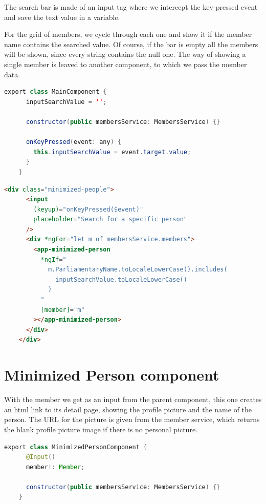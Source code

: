 \documentclass[12pt, a4paper]{article}
\begin{document}
  The search bar is made of an input tag where we intercept the key-pressed event and save the text value in a variable.

  For the grid of members, we cycle through each one and show it if the member name contains the searched value. Of course, if the bar is empty all the members will be shown, since every string contains the null one. The way of showing a single member is leaved to another component, to which we pass the member data.

  \begin{lstlisting}[language=java, caption={Main component}]
    export class MainComponent {
      inputSearchValue = '';

      constructor(public membersService: MembersService) {}

      onKeyPressed(event: any) {
        this.inputSearchValue = event.target.value;
      }
    }\end{lstlisting}

  \begin{lstlisting}[language=html, caption={Main html}]
    <div class="minimized-people">
      <input
        (keyup)="onKeyPressed($event)"
        placeholder="Search for a specific person"
      />
      <div *ngFor="let m of membersService.members">
        <app-minimized-person
          *ngIf="
            m.ParliamentaryName.toLocaleLowerCase().includes(
              inputSearchValue.toLocaleLowerCase()
            )
          "
          [member]="m"
        ></app-minimized-person>
      </div>
    </div>\end{lstlisting}

  \pagebreak
  \section{Minimized Person component}

  With the member we get as an input from the parent component, this one creates an html link to its detail page, showing the profile picture and the name of the person. The URL for the picture is given from the member service, which returns the blank profile picture image if there is no personal picture.

  \begin{lstlisting}[language=java, caption={Minimized Person component}]
    export class MinimizedPersonComponent {
      @Input()
      member!: Member;

      constructor(public membersService: MembersService) {}
    }\end{lstlisting}
\end{document}
